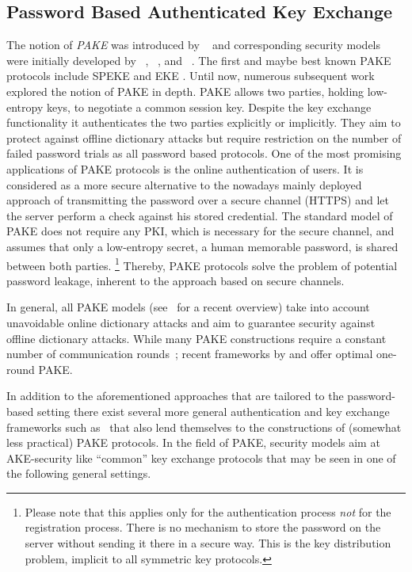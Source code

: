 \subsection{Password Based Authenticated Key Exchange}
The notion of \emph{\ac{PAKE}} was introduced by \citeauthor{bellovin92}~\cite{bellovin92} and corresponding security models were initially developed by \citeauthor{Bellare2000}~\cite{Bellare2000}, \citeauthor{Boyko2000}~\cite{Boyko2000}, and \citeauthor{Goldreich01}~\cite{Goldreich01}.
The first and maybe best known \ac{PAKE} protocols include SPEKE \cite{Jablon96} and EKE \cite{bellovin92,Bellare2000}.
Until now, numerous subsequent work explored the notion of \acl{PAKE} in depth.
\ac{PAKE} allows two parties, holding low-entropy keys, to negotiate a common session key.
Despite the key exchange functionality it authenticates the two parties explicitly or implicitly.
They aim to protect against offline dictionary attacks but require restriction on the number of failed password trials as all password based protocols.
One of the most promising applications of \ac{PAKE} protocols is the online authentication of users.
It is considered as a more secure alternative to the nowadays mainly deployed approach of transmitting the password over a secure channel (\ac{HTTPS}) and let the server perform a check against his stored credential.
The standard model of \ac{PAKE} does not require any \ac{PKI}, which is necessary for the secure channel, and assumes that only a low-entropy secret, \ie a human memorable password, is shared between both parties.
\footnote{Please note that this applies only for the authentication process \emph{not} for the registration process.
There is no mechanism to store the password on the server without sending it there in a secure way.
This is the key distribution problem, implicit to all symmetric key protocols.}
Thereby, \ac{PAKE} protocols solve the problem of potential password leakage, inherent to the approach based on secure channels.

In general, all PAKE models (see~\cite{Pointcheval2012} for a recent overview) take into account unavoidable online dictionary attacks and aim to guarantee security against offline dictionary attacks.
While many PAKE constructions require a constant number of communication rounds~\cite{KatzOY01,Gennaro2003,Abdalla2005,Gennaro2008,Katz2009a,Katz2011}; recent frameworks by \citeauthor{Katz2011} \cite{Katz2011} and \citeauthor{Benhamouda2013} \cite{Benhamouda2013} offer optimal one-round \ac{PAKE}.

In addition to the aforementioned approaches that are tailored to the password-based setting there exist several more general authentication and key exchange frameworks such as~\cite{Camenisch2010,Blazy2012} that also lend themselves to the constructions of (somewhat less practical) \ac{PAKE} protocols.
In the field of \acl{PAKE}, security models aim at \ac{AKE}-security \cite{Bellare1993,Bellare1995} like ``common'' key exchange protocols that may be seen in one of the following general settings.

